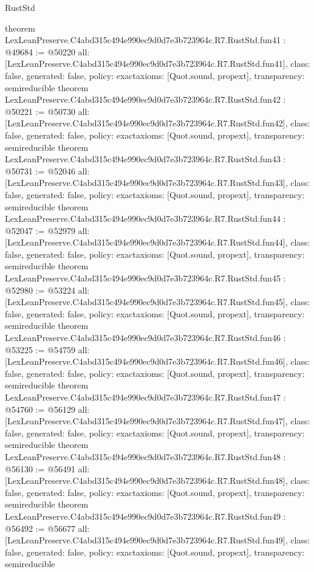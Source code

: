 \begin{lexlean}{RustStd}
\begin{coremodule}
{}
theorem LexLeanPreserve.C4abd315c494e990ec9d0d7e3b723964c.R7.RustStd.fun41 : @49684 := @50220 {
  all: [LexLeanPreserve.C4abd315c494e990ec9d0d7e3b723964c.R7.RustStd.fun41],
  class: false,
  generated: false,
  policy: exact{axioms: [Quot.sound, propext]},
  transparency: semireducible
}
theorem LexLeanPreserve.C4abd315c494e990ec9d0d7e3b723964c.R7.RustStd.fun42 : @50221 := @50730 {
  all: [LexLeanPreserve.C4abd315c494e990ec9d0d7e3b723964c.R7.RustStd.fun42],
  class: false,
  generated: false,
  policy: exact{axioms: [Quot.sound, propext]},
  transparency: semireducible
}
theorem LexLeanPreserve.C4abd315c494e990ec9d0d7e3b723964c.R7.RustStd.fun43 : @50731 := @52046 {
  all: [LexLeanPreserve.C4abd315c494e990ec9d0d7e3b723964c.R7.RustStd.fun43],
  class: false,
  generated: false,
  policy: exact{axioms: [Quot.sound, propext]},
  transparency: semireducible
}
theorem LexLeanPreserve.C4abd315c494e990ec9d0d7e3b723964c.R7.RustStd.fun44 : @52047 := @52979 {
  all: [LexLeanPreserve.C4abd315c494e990ec9d0d7e3b723964c.R7.RustStd.fun44],
  class: false,
  generated: false,
  policy: exact{axioms: [Quot.sound, propext]},
  transparency: semireducible
}
theorem LexLeanPreserve.C4abd315c494e990ec9d0d7e3b723964c.R7.RustStd.fun45 : @52980 := @53224 {
  all: [LexLeanPreserve.C4abd315c494e990ec9d0d7e3b723964c.R7.RustStd.fun45],
  class: false,
  generated: false,
  policy: exact{axioms: [Quot.sound, propext]},
  transparency: semireducible
}
theorem LexLeanPreserve.C4abd315c494e990ec9d0d7e3b723964c.R7.RustStd.fun46 : @53225 := @54759 {
  all: [LexLeanPreserve.C4abd315c494e990ec9d0d7e3b723964c.R7.RustStd.fun46],
  class: false,
  generated: false,
  policy: exact{axioms: [Quot.sound, propext]},
  transparency: semireducible
}
theorem LexLeanPreserve.C4abd315c494e990ec9d0d7e3b723964c.R7.RustStd.fun47 : @54760 := @56129 {
  all: [LexLeanPreserve.C4abd315c494e990ec9d0d7e3b723964c.R7.RustStd.fun47],
  class: false,
  generated: false,
  policy: exact{axioms: [Quot.sound, propext]},
  transparency: semireducible
}
theorem LexLeanPreserve.C4abd315c494e990ec9d0d7e3b723964c.R7.RustStd.fun48 : @56130 := @56491 {
  all: [LexLeanPreserve.C4abd315c494e990ec9d0d7e3b723964c.R7.RustStd.fun48],
  class: false,
  generated: false,
  policy: exact{axioms: [Quot.sound, propext]},
  transparency: semireducible
}
theorem LexLeanPreserve.C4abd315c494e990ec9d0d7e3b723964c.R7.RustStd.fun49 : @56492 := @56677 {
  all: [LexLeanPreserve.C4abd315c494e990ec9d0d7e3b723964c.R7.RustStd.fun49],
  class: false,
  generated: false,
  policy: exact{axioms: [Quot.sound, propext]},
  transparency: semireducible
}
\end{coremodule}
\end{lexlean}
